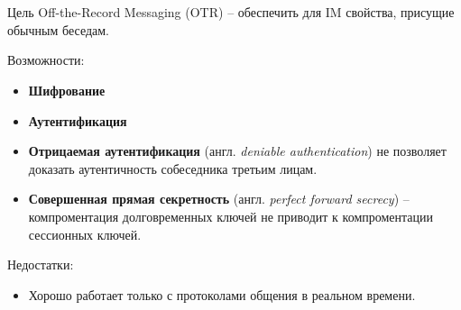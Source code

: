 \documentclass[presentation]{beamer}
\newcommand{\RaisedRightHand}{%
  \raisebox{-.50em}{\Large\HandRight}
}
\begin{document}


\section{}

\begin{frame}{}
  \RaisedRightHand Цель Off-the-Record Messaging (OTR) – обеспечить
  для IM свойства, присущие обычным беседам.\newline

  Возможности:
  \begin{itemize}
  \item \textbf{Шифрование} 
  \item \textbf{Аутентификация}
  \item \textbf{Отрицаемая аутентификация} (англ. \textit{deniable
      authentication}) не позволяет доказать аутентичность собеседника
    третьим лицам.
  \item \textbf{Совершенная прямая секретность} (англ. \textit{perfect
      forward secrecy}) -- компроментация долговременных ключей не
    приводит к компроментации сессионных ключей.

  \end{itemize}
  Недостатки:
  \begin{itemize}
  \item Хорошо работает только с протоколами общения в
    реальном времени.
  \end{itemize}
\end{frame}
\end{document}
